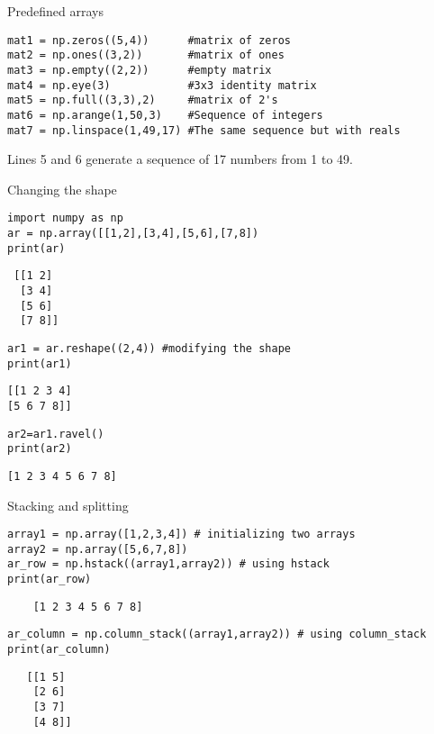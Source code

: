 \documentclass{beamer}
\begin{document}
\begin{frame}[fragile]{Predefined arrays}
\begin{lstlisting}
mat1 = np.zeros((5,4))      #matrix of zeros
mat2 = np.ones((3,2))       #matrix of ones
mat3 = np.empty((2,2))      #empty matrix
mat4 = np.eye(3)            #3x3 identity matrix
mat5 = np.full((3,3),2)     #matrix of 2's
mat6 = np.arange(1,50,3)    #Sequence of integers
mat7 = np.linspace(1,49,17) #The same sequence but with reals

\end{lstlisting}
Lines 5 and 6 generate a sequence of 17 numbers from 1 to 49.

\end{frame}
\begin{frame}[fragile]{Changing the shape}
\begin{lstlisting}
import numpy as np
ar = np.array([[1,2],[3,4],[5,6],[7,8])
print(ar)
\end{lstlisting}
\begin{tiny}
\begin{verbatim}
 [[1 2]
  [3 4]
  [5 6]
  [7 8]]
\end{verbatim}
\end{tiny}
\begin{lstlisting}
ar1 = ar.reshape((2,4)) #modifying the shape
print(ar1)
\end{lstlisting}
\begin{tiny}
\begin{verbatim}
[[1 2 3 4]
[5 6 7 8]]
\end{verbatim}
\end{tiny}
\begin{lstlisting}
ar2=ar1.ravel()
print(ar2)
\end{lstlisting}
\begin{tiny}
\begin{verbatim}
[1 2 3 4 5 6 7 8]
\end{verbatim}
\end{tiny}
\end{frame}
\begin{frame}[fragile]{Stacking and splitting}
\begin{lstlisting}
array1 = np.array([1,2,3,4]) # initializing two arrays
array2 = np.array([5,6,7,8])
ar_row = np.hstack((array1,array2)) # using hstack
print(ar_row)
\end{lstlisting}
\begin{tiny}
\begin{verbatim}
    [1 2 3 4 5 6 7 8]
\end{verbatim}
\end{tiny}

\begin{lstlisting}
ar_column = np.column_stack((array1,array2)) # using column_stack
print(ar_column)
\end{lstlisting}

\begin{tiny}
\begin{verbatim}
   [[1 5]
    [2 6]
    [3 7]
    [4 8]]
\end{verbatim}
\end{tiny}
\end{frame}
\end{document}
